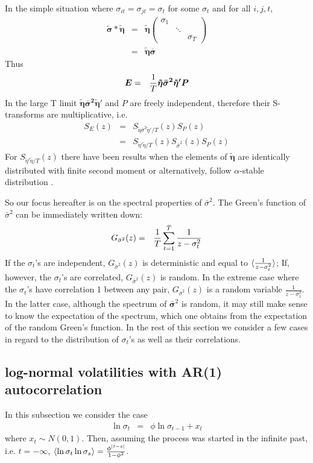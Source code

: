 \message{ !name(draft4.tex)}\documentclass{article}
\begin{document}
In the simple situation where $\sigma_{it} =
\sigma_{jt} = \sigma_t$ for some $\sigma_t$ and for all $i, j, t$,
\begin{eqnarray*}
  \bm{\tilde \sigma * \tilde \eta} &=& \bm{\tilde \eta}
  \begin{pmatrix}
    \sigma_1 &        & \\
        & \ddots & \\
        &        & \sigma_T
  \end{pmatrix} \\
  &=& \bm{\tilde \eta \bar \sigma}
\end{eqnarray*}
Thus
\begin{eqnarray*}
  \bm E &=& {1 \over T}\bm{\tilde \eta \bar \sigma^2 \tilde \eta' P}
\end{eqnarray*}
In the large T limit $\bm{\tilde \eta \bar \sigma^2 \tilde \eta'}$ and $P$ are
freely independent, therefore their S-transforms are multiplicative,
i.e.
\begin{eqnarray*}
  S_E(z) &=& S_{\tilde \eta \bar \sigma^2 \tilde \eta'/T}(z) S_P(z) \\
  &=& S_{\tilde \eta' \tilde \eta /T}(z) S_{\bar \sigma^2}(z) S_P(z)
\end{eqnarray*}
For $S_{\tilde \eta' \tilde \eta /T}(z)$ there have been results when
the elements of $\bm{\tilde \eta}$ are identically distributed with finite
second moment \cite{burda2011} or alternatively, follow $\alpha$-stable
distribution \cite{politi2010}.

So our focus hereafter is on the spectral properties of
$\bar \sigma^2$. The Green's function of $\bar \sigma^2$ can be immediately
written down:
\begin{eqnarray*}
  G_{\bar \sigma^2}(z) &=& {1 \over T} \sum_{t=1}^T \frac{1}{z - \sigma_t^2}
\end{eqnarray*}
If the $\sigma_t$'s are independent, $G_{\bar \sigma^2}(z)$ is deterministic and
equal to $\langle\frac{1}{z - \sigma_t^2}\rangle$; If, however, the $\sigma_t$'s are
correlated, $G_{\bar \sigma^2}(z)$ is random. In the extreme case where the
$\sigma_t$'s have correlation 1 between any pair, $G_{\bar \sigma^2}(z)$ is a
random variable $\frac{1}{z - \sigma_1^2}$. In the latter case, although
the spectrum of $\bm \bar \sigma^2$ is random, it may still make sense to
know the expectation of the spectrum, which one obtains from the
expectation of the random Green's function. In the rest of this
section we consider a few cases in regard to the distribution of
$\sigma_t$'s as well as their correlations.

\subsection{log-normal volatilities with AR(1) autocorrelation}
In this subsection we consider the case
\begin{eqnarray*}
  \ln \sigma_t &=& \phi\ln \sigma_{t-1} + x_t
\end{eqnarray*}
where $x_t \sim N(0, 1)$. Then, assuming the process was started in
the infinite past, i.e. $t = -\infty$, $\langle\ln \sigma_t \ln \sigma_s\rangle =
\frac{\phi^{|t-s|}}{1 - \phi^2}$.



\end{document}
